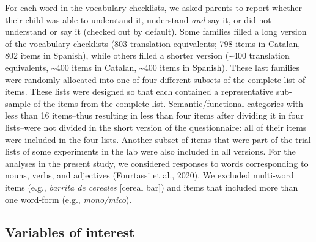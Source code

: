 \documentclass[
  letterpaper,
  DIV=11,
  numbers=noendperiod]{scrartcl}
\begin{document}
For each word in the vocabulary checklists, we asked parents to report
whether their child was able to understand it, understand \emph{and} say
it, or did not understand or say it (checked out by default). Some
families filled a long version of the vocabulary checklists (803
translation equivalents; 798 items in Catalan, 802 items in Spanish),
while others filled a shorter version (\textasciitilde400 translation
equivalents, \textasciitilde400 items in Catalan, \textasciitilde400
items in Spanish). These last families were randomly allocated into one
of four different subsets of the complete list of items. These lists
were designed so that each contained a representative sub-sample of the
items from the complete list. Semantic/functional categories with less
than 16 items--thus resulting in less than four items after dividing it
in four lists--were not divided in the short version of the
questionnaire: all of their items were included in the four lists.
Another subset of items that were part of the trial lists of some
experiments in the lab were also included in all versions. For the
analyses in the present study, we considered responses to words
corresponding to nouns, verbs, and adjectives (Fourtassi et al., 2020).
We excluded multi-word items (e.g., \emph{barrita de cereales} {[}cereal
bar{]}) and items that included more than one word-form (e.g.,
\emph{mono/mico}).

\hypertarget{variables-of-interest}{%
\subsection{Variables of interest}\label{variables-of-interest}}
\end{document}
